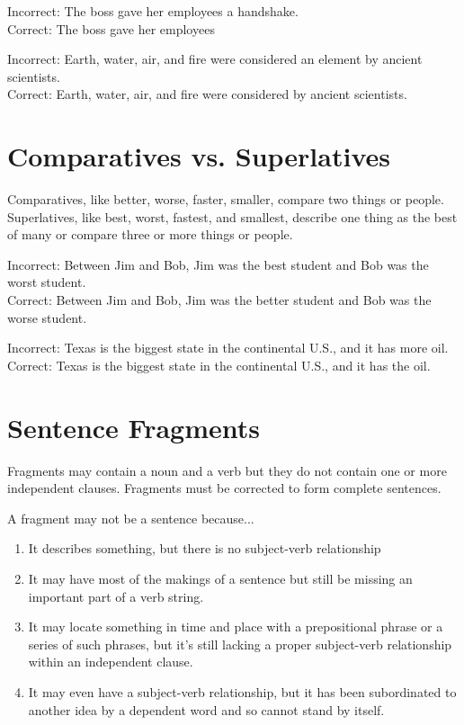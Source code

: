 \bigskip
Incorrect:  The boss gave her employees a handshake.\\
Correct:  The boss gave her employees \hrulefill

\bigskip
Incorrect:  Earth, water, air, and fire were considered an element by ancient scientists.\\
Correct:  Earth, water, air, and fire were considered  \longline by ancient scientists.

\section{Comparatives vs. Superlatives}
Comparatives, like better, worse, faster, smaller, compare two things or people.\\
Superlatives, like best, worst, fastest, and smallest, describe one thing as the best of many or compare three or more things or people.

\bigskip
Incorrect:  Between Jim and Bob, Jim was the best student and Bob was the worst student. \\
Correct:  Between Jim and Bob, Jim was the better student and Bob was the worse student.

\bigskip
Incorrect:  Texas is the biggest state in the continental U.S., and it has more oil.
Correct:  Texas is the biggest state in the continental U.S., and it has the \longline oil.

\section{Sentence Fragments}
Fragments may contain a noun and a verb but they do not contain one or more independent clauses. Fragments must be corrected to form complete sentences. 

\bigskip
A fragment may not be a sentence because...
\begin{enumerate}
\item{It describes something, but there is no subject-verb relationship}
\item{It may have most of the makings of a sentence but still be missing an important part of a verb string.}
\item{It may locate something in time and place with a prepositional phrase or a series of such phrases, but it's still lacking a proper subject-verb relationship within an independent clause.}
\item{It may even have a subject-verb relationship, but it has been subordinated to another idea by a dependent word and so cannot stand by itself.}
\end{enumerate}

